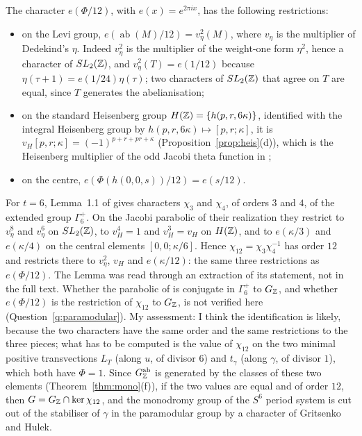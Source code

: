 The character $e(\Phi/12)$, with $e(x)=e^{2\pi ix}$, has the following restrictions:
\begin{itemize}
\item on the Levi group, $e(\operatorname{ab}(M)/12)=v_\eta^2(M)$, where $v_\eta$ is the multiplier of Dedekind's $\eta$. Indeed $v_\eta^2$ is the multiplier of the weight-one form $\eta^2$, hence a character of $SL_2(\mathbb{Z})$, and $v_\eta^2(T)=e(1/12)$ because $\eta(\tau+1)=e(1/24)\eta(\tau)$; two characters of $SL_2(\mathbb{Z})$ that agree on $T$ are equal, since $T$ generates the abelianisation;
\item on the standard Heisenberg group $H(\mathbb{Z})=\{h(p,r,6\kappa)\}$, identified with the integral Heisenberg group by $h(p,r,6\kappa)\mapsto[p,r;\kappa]$, it is $v_H[p,r;\kappa]=(-1)^{p+r+pr+\kappa}$ (Proposition~\ref{prop:heis}(d)), which is the Heisenberg multiplier of the odd Jacobi theta function in \cite[(1.4)--(1.5)]{GritsenkoHulek};
\item on the centre, $e(\Phi(h(0,0,s))/12)=e(s/12)$.
\end{itemize}
For $t=6$, Lemma~1.1 of \cite{GritsenkoHulek} gives characters $\chi_3$ and $\chi_4$, of orders $3$ and $4$, of the extended group $\Gamma_6^+$. On the Jacobi parabolic of their realization they restrict to $v_\eta^{8}$ and $v_\eta^{6}$ on $SL_2(\mathbb{Z})$, to $v_H^{4}=1$ and $v_H^{3}=v_H$ on $H(\mathbb{Z})$, and to $e(\kappa/3)$ and $e(\kappa/4)$ on the central elements $[0,0;\kappa/6]$. Hence $\chi_{12}=\chi_3\chi_4^{-1}$ has order $12$ and restricts there to $v_\eta^2$, $v_H$ and $e(\kappa/12)$: the same three restrictions as $e(\Phi/12)$. The Lemma was read through an extraction of its statement, not in the full text. Whether the parabolic of \cite{GritsenkoHulek} is conjugate in $\Gamma_6^+$ to $G_{\mathbb{Z}}$, and whether $e(\Phi/12)$ is the restriction of $\chi_{12}$ to $G_{\mathbb{Z}}$, is not verified here (Question~\ref{q:paramodular}). My assessment: I think the identification is likely, because the two characters have the same order and the same restrictions to the three pieces; what has to be computed is the value of $\chi_{12}$ on the two minimal positive transvections $L_T$ (along $u$, of divisor $6$) and $t_\gamma$ (along $\gamma$, of divisor $1$), which both have $\Phi=1$. Since $G_{\mathbb{Z}}^{\mathrm{ab}}$ is generated by the classes of these two elements (Theorem~\ref{thm:mono}(f)), if the two values are equal and of order $12$, then $G=G_{\mathbb{Z}}\cap\ker\chi_{12}$, and the monodromy group of the $S^6$ period system is cut out of the stabiliser of $\gamma$ in the paramodular group by a character of Gritsenko and Hulek.

